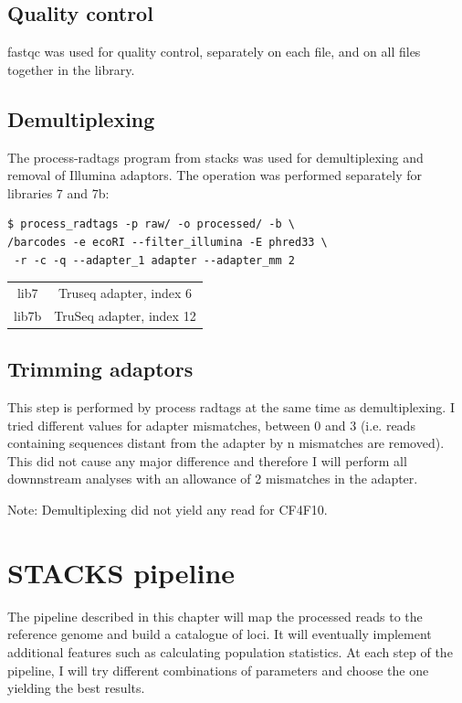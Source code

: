 \documentclass[10pt,a4paper]{report}
\begin{document}
 \section{Quality control}
 fastqc was used for quality control, separately on each file, and on all files together in the library.
 \section{Demultiplexing}
 The process-radtags program from stacks was used for demultiplexing and removal of Illumina adaptors. The operation was performed separately for libraries 7 and 7b:

\begin{lstlisting}
$ process_radtags -p raw/ -o processed/ -b \
/barcodes -e ecoRI --filter_illumina -E phred33 \
 -r -c -q --adapter_1 adapter --adapter_mm 2
\end{lstlisting}


\begin{center}
\begin{tabular}{c c}
lib7 & Truseq adapter, index 6 \footnotemark\\ 
lib7b & TruSeq adapter, index 12 \footnotemark\\
\end{tabular}
\end{center}
\section{Trimming adaptors}
This step is performed by process radtags at the same time as demultiplexing. I tried different values for adapter mismatches, between 0 and 3 (i.e. reads containing sequences distant from the adapter by n mismatches are removed). This did not cause any major difference and therefore I will perform all downnstream analyses with an allowance of 2 mismatches in the adapter.

Note: Demultiplexing did not yield any read for CF4F10. 

\chapter{STACKS pipeline}

The pipeline described in this chapter will map the processed reads to the reference genome and build a catalogue of loci. It will eventually implement additional features such as calculating population statistics. At each step of the pipeline, I will try different combinations of parameters and choose the one yielding the best results. 
\end{document}
